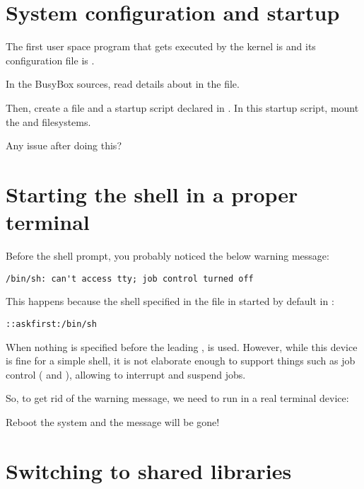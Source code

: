 \section{System configuration and startup}

The first user space program that gets executed by the kernel is
 and its configuration file is .

In the BusyBox sources, read details about  in the
 file.

Then, create a  file and a 
startup script declared in . In this startup
script, mount the  and  filesystems.

Any issue after doing this?

\section{Starting the shell in a proper terminal}

Before the shell prompt, you probably noticed the below warning message:

\begin{verbatim}
/bin/sh: can't access tty; job control turned off
\end{verbatim}

This happens because the shell specified in the  file
in started by default in :

\begin{verbatim}
::askfirst:/bin/sh
\end{verbatim}

When nothing is specified before the leading \code{::}, 
is used. However, while this device is fine for a simple shell, it is
not elaborate enough to support things such as job control
(\code{[Ctrl][c]} and \code{[Ctrl][z]}), allowing to interrupt and
suspend jobs.

So, to get rid of the warning message, we need  to run
 in a real terminal device:


Reboot the system and the message will be gone!

\section{Switching to shared libraries}

